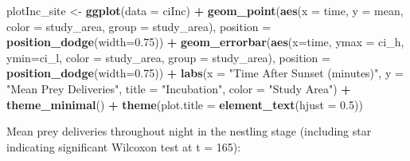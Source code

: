 \documentclass[]{article}
\newenvironment{Shaded}{\begin{snugshade}}{\end{snugshade}}
\newcommand{\DataTypeTok}[1]{\textcolor[rgb]{0.13,0.29,0.53}{#1}}
\newcommand{\FloatTok}[1]{\textcolor[rgb]{0.00,0.00,0.81}{#1}}
\newcommand{\KeywordTok}[1]{\textcolor[rgb]{0.13,0.29,0.53}{\textbf{#1}}}
\newcommand{\NormalTok}[1]{#1}
\newcommand{\OperatorTok}[1]{\textcolor[rgb]{0.81,0.36,0.00}{\textbf{#1}}}
\newcommand{\StringTok}[1]{\textcolor[rgb]{0.31,0.60,0.02}{#1}}
\begin{document}
\begin{Shaded}
\begin{Highlighting}[]
\NormalTok{plotInc_site <-}\StringTok{ }\KeywordTok{ggplot}\NormalTok{(}\DataTypeTok{data =}\NormalTok{ ciInc) }\OperatorTok{+}
\StringTok{  }\KeywordTok{geom_point}\NormalTok{(}\KeywordTok{aes}\NormalTok{(}\DataTypeTok{x =}\NormalTok{ time, }\DataTypeTok{y =}\NormalTok{ mean, }\DataTypeTok{color =}\NormalTok{ study_area, }\DataTypeTok{group =}\NormalTok{ study_area),}
             \DataTypeTok{position =} \KeywordTok{position_dodge}\NormalTok{(}\DataTypeTok{width=}\FloatTok{0.75}\NormalTok{)) }\OperatorTok{+}
\StringTok{  }\KeywordTok{geom_errorbar}\NormalTok{(}\KeywordTok{aes}\NormalTok{(}\DataTypeTok{x=}\NormalTok{time, }\DataTypeTok{ymax =}\NormalTok{ ci_h, }\DataTypeTok{ymin=}\NormalTok{ci_l, }\DataTypeTok{color =}\NormalTok{ study_area, }
                    \DataTypeTok{group =}\NormalTok{ study_area),}
                \DataTypeTok{position =} \KeywordTok{position_dodge}\NormalTok{(}\DataTypeTok{width=}\FloatTok{0.75}\NormalTok{)) }\OperatorTok{+}
\StringTok{  }\KeywordTok{labs}\NormalTok{(}\DataTypeTok{x =} \StringTok{"Time After Sunset (minutes)"}\NormalTok{, }\DataTypeTok{y =} \StringTok{"Mean Prey Deliveries"}\NormalTok{, }
       \DataTypeTok{title =} \StringTok{"Incubation"}\NormalTok{, }\DataTypeTok{color =} \StringTok{"Study Area"}\NormalTok{) }\OperatorTok{+}
\StringTok{  }\KeywordTok{theme_minimal}\NormalTok{() }\OperatorTok{+}
\StringTok{  }\KeywordTok{theme}\NormalTok{(}\DataTypeTok{plot.title =} \KeywordTok{element_text}\NormalTok{(}\DataTypeTok{hjust =} \FloatTok{0.5}\NormalTok{))}
\end{Highlighting}
\end{Shaded}

Mean prey deliveries throughout night in the nestling stage (including
star indicating significant Wilcoxon test at t = 165):
\end{document}
